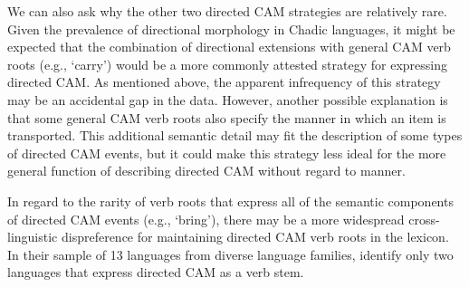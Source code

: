We can also ask why the other two directed CAM strategies are relatively rare. Given the prevalence of directional morphology in Chadic languages, it might be expected that the combination of directional extensions with general CAM verb roots (e.g., `carry') would be a more commonly attested strategy for expressing directed CAM. As mentioned above, the apparent infrequency of this strategy may be an accidental gap in the data. However, another possible explanation is that some general CAM verb roots also specify the manner in which an item is transported. This additional semantic detail may fit the description of some types of directed CAM events, but it could make this strategy less ideal for the more general function of describing directed CAM without regard to manner. 

In regard to the rarity of verb roots that express all of the semantic components of directed CAM events (e.g., `bring'), there may be a more widespread cross-linguistic dispreference for maintaining directed CAM verb roots in the lexicon. In their sample of 13 languages from diverse language families, \citet[11]{hellwigBringingTakingCrosslinguistic2022} identify only two languages that express directed CAM as a verb stem. 
